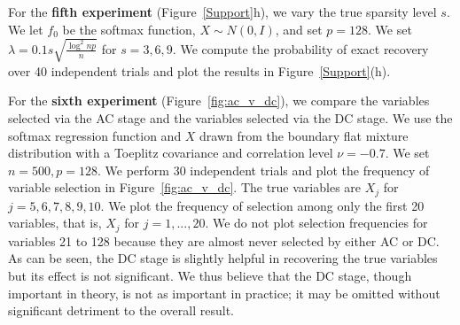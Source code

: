 For the \textbf{fifth experiment} (Figure~\ref{Support}h), we vary the true sparsity level $s$. We let $f_0$ be the softmax function, $X \sim N(0, I)$, and set $p=128$. We set $\lambda = 0.1 s \sqrt{\frac{\log^2 np}{n}}$ for $s = 3,6,9$. We compute the probability of exact recovery over 40 independent trials and plot the results in Figure~\ref{Support}(h). 

For the \textbf{sixth experiment} (Figure~\ref{fig:ac_v_dc}), we compare the variables selected via the AC stage and the variables selected via the DC stage. We use the softmax regression function and $X$ drawn from the boundary flat mixture distribution with a Toeplitz covariance and correlation level $\nu = -0.7$. We set $n=500, p=128$. We perform 30 independent trials and plot the frequency of variable selection in Figure~\ref{fig:ac_v_dc}. The true variables are $X_j$ for $j=5,6,7,8,9,10$. We plot the frequency of selection among only the first 20 variables, that is, $X_j$ for $j=1,...,20$. We do not plot selection frequencies for variables 21 to 128 because they are almost never selected by either AC or DC. As can be seen, the DC stage is slightly helpful in recovering the true variables but its effect is not significant. We thus believe that the DC stage, though important in theory, is not as important in practice; it may be omitted without significant detriment to the overall result. 

